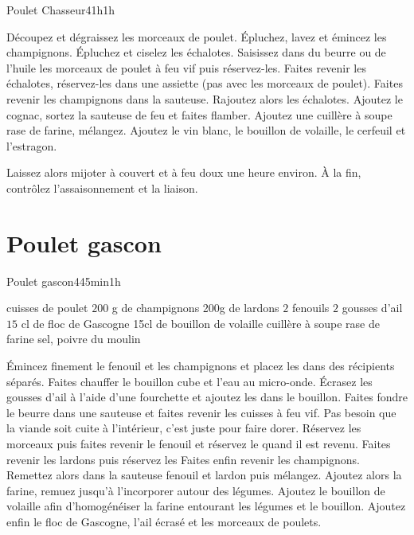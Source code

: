 {\begin{recette}{Poulet Chasseur}{4}{1h}{1h}
\begin{preparation}
\etape Découpez et dégraissez les morceaux de poulet. 
\etape Épluchez, lavez et émincez les champignons. Épluchez et ciselez les échalotes.
\etape Saisissez dans du beurre ou de l'huile les morceaux de poulet à feu vif puis réservez-les.
\etape Faites revenir les échalotes, réservez-les dans une assiette (pas avec les morceaux de poulet).
\etape Faites revenir les champignons dans la sauteuse. 
\etape Rajoutez alors les échalotes. Ajoutez le cognac, sortez la sauteuse de feu et faites flamber. 
\etape Ajoutez une cuillère à soupe rase de farine, mélangez.
\etape Ajoutez le vin blanc, le bouillon de volaille, le cerfeuil et l'estragon. 
\end{preparation}

\begin{cuisson}
Laissez alors mijoter à couvert et à feu doux une heure environ. À la fin, contrôlez l'assaisonnement et la liaison.
\end{cuisson}
\end{recette}

\section{Poulet gascon}
\begin{recette}{Poulet gascon}{4}{45min}{1h}

\begin{ingredients}
 cuisses de poulet
\ingredient $200$ g de champignons
\ingredient 200g de lardons
\ingredient $2$ fenouils
\ingredient $2$ gousses d'ail
\ingredient $15$ cl de floc de Gascogne
\ingredient 15cl de bouillon de volaille
 cuillère à soupe rase de farine
\ingredient sel, poivre du moulin
\end{ingredients}

\begin{preparation}
\etape Émincez finement le fenouil et les champignons et placez les dans des récipients séparés.
\etape Faites chauffer le bouillon cube et l'eau au micro-onde. Écrasez les gousses d'ail à l'aide d'une fourchette et ajoutez 
les dans le bouillon.
\etape Faites fondre le beurre dans une sauteuse et faites revenir les cuisses à feu vif. Pas besoin que la viande soit cuite à 
l'intérieur, c'est juste pour faire dorer.
\etape Réservez les morceaux puis faites revenir le fenouil et réservez le quand il est revenu.
\etape Faites revenir les lardons puis réservez les
\etape Faites enfin revenir les champignons.
\etape Remettez alors dans la sauteuse fenouil et lardon puis mélangez.
\etape Ajoutez alors la farine, remuez jusqu'à l'incorporer autour des légumes.
\etape Ajoutez le bouillon de volaille afin d'homogénéiser la farine entourant les légumes et le bouillon.
\etape Ajoutez enfin le floc de Gascogne, l'ail écrasé et les morceaux de poulets.
\end{preparation}


\end{recette}}
